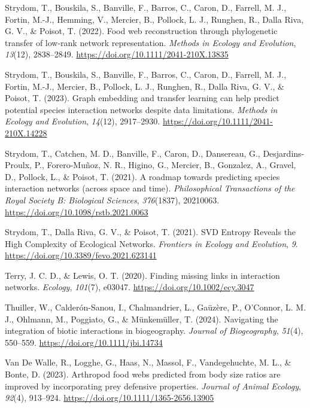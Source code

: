 \documentclass[
]{article}
\newlength{\cslhangindent}
\newenvironment{CSLReferences}[2] %
 {\begin{list}{}{%
  \setlength{\itemindent}{0pt}
  \setlength{\leftmargin}{0pt}
  \setlength{\parsep}{0pt}
  \ifodd #1
   \setlength{\leftmargin}{\cslhangindent}
   \setlength{\itemindent}{-1\cslhangindent}
  \fi
  \setlength{\itemsep}{#2\baselineskip}}}
 {\end{list}}
\begin{document}
\begin{CSLReferences}{1}{0}
Strydom, T., Bouskila, S., Banville, F., Barros, C., Caron, D., Farrell,
M. J., Fortin, M.-J., Hemming, V., Mercier, B., Pollock, L. J., Runghen,
R., Dalla Riva, G. V., \& Poisot, T. (2022). Food web reconstruction
through phylogenetic transfer of low-rank network representation.
\emph{Methods in Ecology and Evolution}, \emph{13}(12), 2838--2849.
\url{https://doi.org/10.1111/2041-210X.13835}

Strydom, T., Bouskila, S., Banville, F., Barros, C., Caron, D., Farrell,
M. J., Fortin, M.-J., Mercier, B., Pollock, L. J., Runghen, R., Dalla
Riva, G. V., \& Poisot, T. (2023). Graph embedding and transfer learning
can help predict potential species interaction networks despite data
limitations. \emph{Methods in Ecology and Evolution}, \emph{14}(12),
2917--2930. \url{https://doi.org/10.1111/2041-210X.14228}

Strydom, T., Catchen, M. D., Banville, F., Caron, D., Dansereau, G.,
Desjardins-Proulx, P., Forero-Muñoz, N. R., Higino, G., Mercier, B.,
Gonzalez, A., Gravel, D., Pollock, L., \& Poisot, T. (2021). A roadmap
towards predicting species interaction networks (across space and time).
\emph{Philosophical Transactions of the Royal Society B: Biological
Sciences}, \emph{376}(1837), 20210063.
\url{https://doi.org/10.1098/rstb.2021.0063}

Strydom, T., Dalla Riva, G. V., \& Poisot, T. (2021). {SVD Entropy
Reveals} the {High Complexity} of {Ecological Networks}. \emph{Frontiers
in Ecology and Evolution}, \emph{9}.
\url{https://doi.org/10.3389/fevo.2021.623141}

Terry, J. C. D., \& Lewis, O. T. (2020). Finding missing links in
interaction networks. \emph{Ecology}, \emph{101}(7), e03047.
\url{https://doi.org/10.1002/ecy.3047}

Thuiller, W., Calderón-Sanou, I., Chalmandrier, L., Gaüzère, P.,
O'Connor, L. M. J., Ohlmann, M., Poggiato, G., \& Münkemüller, T.
(2024). Navigating the integration of biotic interactions in
biogeography. \emph{Journal of Biogeography}, \emph{51}(4), 550--559.
\url{https://doi.org/10.1111/jbi.14734}

Van De Walle, R., Logghe, G., Haas, N., Massol, F., Vandegehuchte, M.
L., \& Bonte, D. (2023). Arthropod food webs predicted from body size
ratios are improved by incorporating prey defensive properties.
\emph{Journal of Animal Ecology}, \emph{92}(4), 913--924.
\url{https://doi.org/10.1111/1365-2656.13905}


\end{CSLReferences}
\end{document}
